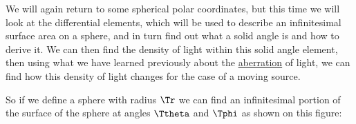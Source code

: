 We will again return to some spherical polar coordinates, but this time we will look at the differential elements, which will be used to describe an infinitesimal surface area on a sphere, and in turn find out what a solid angle is and how to derive it.
We can then find the density of light within this solid angle element, then using what we have learned previously about the \hyperlink{def-aberration}{aberration} of light, we can find how this density of light changes for the case of a moving source.

So if we define a sphere with radius $\Tr $ we can find an infinitesimal portion of the surface of the sphere at angles ${\Ttheta }$ and ${\Tphi }$ as shown on this figure:

\begin{figure}[H]
	\centering


\end{figure}
